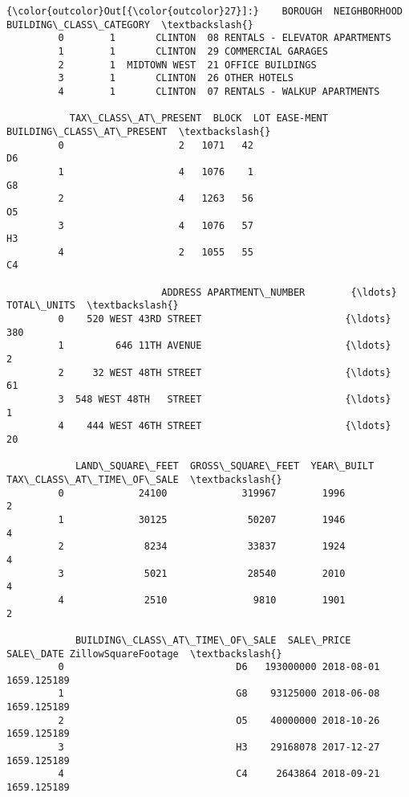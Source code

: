 \documentclass[11pt]{article}
\begin{document}
\begin{Verbatim}[commandchars=\\\{\}]
{\color{outcolor}Out[{\color{outcolor}27}]:}    BOROUGH  NEIGHBORHOOD                      BUILDING\_CLASS\_CATEGORY  \textbackslash{}
         0        1       CLINTON  08 RENTALS - ELEVATOR APARTMENTS              
         1        1       CLINTON  29 COMMERCIAL GARAGES                         
         2        1  MIDTOWN WEST  21 OFFICE BUILDINGS                           
         3        1       CLINTON  26 OTHER HOTELS                               
         4        1       CLINTON  07 RENTALS - WALKUP APARTMENTS                
         
           TAX\_CLASS\_AT\_PRESENT  BLOCK  LOT EASE-MENT BUILDING\_CLASS\_AT\_PRESENT  \textbackslash{}
         0                    2   1071   42                                  D6   
         1                    4   1076    1                                  G8   
         2                    4   1263   56                                  O5   
         3                    4   1076   57                                  H3   
         4                    2   1055   55                                  C4   
         
                           ADDRESS APARTMENT\_NUMBER        {\ldots}          TOTAL\_UNITS  \textbackslash{}
         0    520 WEST 43RD STREET                         {\ldots}                  380   
         1         646 11TH AVENUE                         {\ldots}                    2   
         2     32 WEST 48TH STREET                         {\ldots}                   61   
         3  548 WEST 48TH   STREET                         {\ldots}                    1   
         4    444 WEST 46TH STREET                         {\ldots}                   20   
         
            LAND\_SQUARE\_FEET  GROSS\_SQUARE\_FEET  YEAR\_BUILT  TAX\_CLASS\_AT\_TIME\_OF\_SALE  \textbackslash{}
         0             24100             319967        1996                          2   
         1             30125              50207        1946                          4   
         2              8234              33837        1924                          4   
         3              5021              28540        2010                          4   
         4              2510               9810        1901                          2   
         
            BUILDING\_CLASS\_AT\_TIME\_OF\_SALE  SALE\_PRICE  SALE\_DATE ZillowSquareFootage  \textbackslash{}
         0                              D6   193000000 2018-08-01         1659.125189   
         1                              G8    93125000 2018-06-08         1659.125189   
         2                              O5    40000000 2018-10-26         1659.125189   
         3                              H3    29168078 2017-12-27         1659.125189   
         4                              C4     2643864 2018-09-21         1659.125189   
         

\end{Verbatim}
\end{document}
